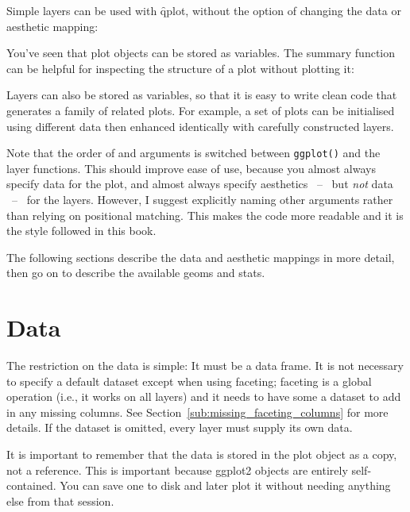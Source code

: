 Simple layers can be used with \f{qplot}, without the option of changing the data or aesthetic mapping:

% 


You've seen that plot objects can be stored as variables. The summary function can be helpful for inspecting the structure of a plot without plotting it:

%
%


Layers can also be stored as variables, so that it is easy to write clean code that generates a family of related plots.  For example, a set of plots can be initialised using different data then enhanced identically with carefully constructed layers.

Note that the order of  and  arguments is switched between {\tt ggplot()} and the layer functions.  This should improve ease of use, because you almost always specify data for the plot, and almost always specify aesthetics ~--~ but {\em not} data ~--~ for the layers.  However, I suggest explicitly naming other arguments rather than relying on positional matching.  This makes the code more readable and it is the style followed in this book.

The following sections describe the data and aesthetic mappings in more detail, then go on to describe the available geoms and stats.

\section{Data}
\label{sec:data}

The restriction on the data is simple: It must be a data frame.  It is not necessary to specify a default dataset except when using faceting; faceting is a global operation (i.e., it works on all layers) and it needs to have some a dataset to add in any missing columns.  See Section~\ref{sub:missing_faceting_columns} for more details.  If the dataset is omitted, every layer must supply its own data.

It is important to remember that the data is stored in the plot object as a copy, not a reference.  This is important because ggplot2 objects are entirely self-contained.  You can save one to disk and later plot it without needing anything else from that session.

